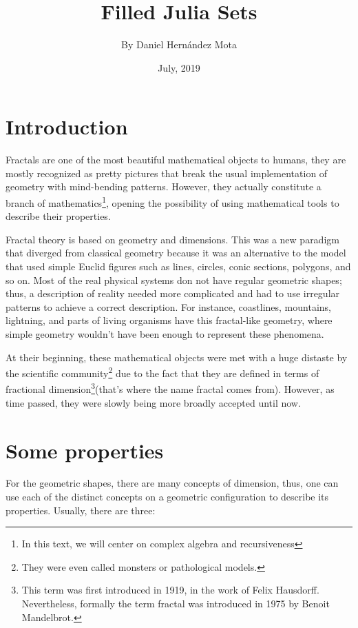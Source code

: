 \documentclass{article}
\title{Filled Julia Sets}
\author{By Daniel Hernández Mota}
\date{July, 2019}
\begin{document}
\maketitle

\newpage
\section{Introduction}

Fractals are one of the most beautiful mathematical objects to humans, they are mostly recognized as pretty pictures that break the usual implementation of geometry with mind-bending patterns. However, they actually constitute a branch of mathematics\footnote{In this text, we will center on complex algebra and recursiveness}, opening the possibility of using mathematical tools to describe their properties\cite{Edyta}. 

Fractal theory is based on geometry and dimensions. This was a new paradigm that diverged from classical geometry because it was an alternative to the model that used simple Euclid figures such as lines, circles, conic sections, polygons, and so on. Most of the real physical systems don not have regular geometric shapes; thus, a description of reality needed more complicated and had to use irregular patterns to achieve a correct description\cite{Crownover}. For instance, coastlines, mountains, lightning, and parts of living organisms have this fractal-like geometry, where simple geometry wouldn't have been enough to represent these phenomena\cite{Edyta}.

At their beginning, these mathematical objects were met with a huge distaste by the scientific community\footnote{They were even called monsters or pathological models.} due to the fact that they are defined in terms of fractional dimension\footnote{This term was first introduced in 1919, in the work of Felix Hausdorff. Nevertheless, formally the term fractal was introduced in 1975 by Benoit Mandelbrot.}(that's where the name fractal comes from). However, as time passed, they were slowly being more broadly accepted until now. 
\section{Some properties}
For the geometric shapes, there are many concepts of dimension, thus, one can use each of the distinct concepts on a geometric configuration to describe its properties. Usually, there are three\cite{Crownover}:
\end{document}
